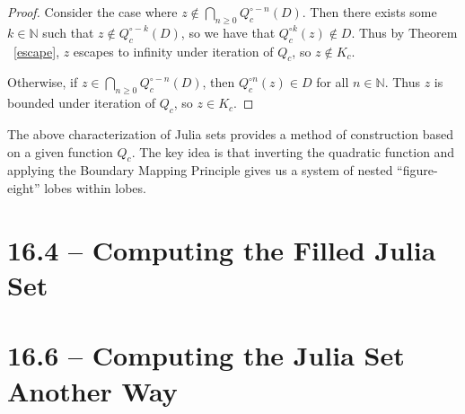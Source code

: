 \documentclass[symmetric]{tufte-handout}
\begin{document}
\begin{proof}
    Consider the case where
    $z\notin \bigcap\limits_{n\ge 0} Q_c^{\circ -n} (D)$.
    Then there exists some $k\in \mathbb{N}$ such that $z\notin Q_c^{\circ -k} (D)$,
    so we have that $Q_c^{\circ k}(z) \notin D$. 
    Thus by Theorem ~\ref{escape}, $z$ escapes to infinity under iteration
    of $Q_c$, so $z\notin K_c$.  

    Otherwise, if $z\in \bigcap\limits_{n\ge 0} Q_c^{\circ -n} (D)$, then 
     $Q_c^{\circ n}(z) \in D$ for all $n\in \mathbb{N}$. Thus $z$ is bounded under
     iteration of $Q_c$, so $z\in K_c$.
\end{proof}

The above characterization of Julia sets provides a method of construction based on 
a given function $Q_c$. The key idea is that inverting the quadratic function and 
applying the Boundary Mapping Principle gives us a system of nested ``figure-eight''
lobes within lobes.



\section{16.4 -- Computing the Filled Julia Set}\label{sec:problem-1}










\section{16.6 -- Computing the Julia Set Another Way}\label{sec:problem-1}
\end{document}
